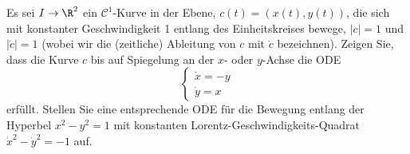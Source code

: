 \begin{aufgabe}
Es sei $I \to \R^2$ ein $\mathcal{C}^1$-Kurve in der Ebene, $c(t) = (x(t),y(t))$, die sich mit konstanter Geschwindigkeit 1 entlang des Einheitskreises bewege, $|c|=1$ und $|\dot{c}|=1$ (wobei wir die (zeitliche) Ableitung von $c$ mit $\dot{c}$ bezeichnen). Zeigen Sie, dass die Kurve $c$ bis auf Spiegelung an der $x$- oder $y$-Achse die ODE
\begin{equation*}
	\begin{cases}
		\dot{x} = -y \\
		\dot{y} = x
	\end{cases}
\end{equation*}
erfüllt. Stellen Sie eine entsprechende ODE für die Bewegung entlang der Hyperbel $x^2-y^2=1$ mit konstanten Lorentz-Geschwindigkeits-Quadrat $\dot{x}^2-\dot{y}^2=-1$ auf.

\end{aufgabe}
